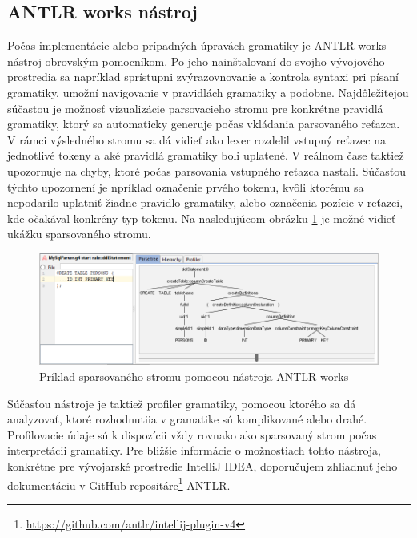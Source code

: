\subsection{ANTLR works nástroj}
Počas implementácie alebo prípadných úpravách gramatiky je ANTLR works nástroj obrovským pomocníkom. Po jeho nainštalovaní do svojho vývojového prostredia sa napríklad sprístupni zvýrazovnovanie a kontrola syntaxi pri písaní gramatiky, umožní navigovanie v pravidlách gramatiky a podobne. Najdôležitejou súčastou je možnosť vizualizácie parsovacieho stromu pre konkrétne pravidlá gramatiky, ktorý sa automaticky generuje počas vkládania parsovaného reťazca. V rámci výsledného stromu sa dá vidieť ako lexer rozdelil vstupný reťazec na jednotlivé tokeny a aké pravidlá gramatiky boli uplatené. V reálnom čase taktiež upozornuje na chyby, ktoré počas parsovania vstupného reťazca nastali. Súčasťou týchto upozornení je npríklad označenie prvého tokenu, kvôli ktorému sa nepodarilo uplatniť žiadne pravidlo gramatiky, alebo označenia pozície v reťazci, kde očakával konkrény typ tokenu. Na nasledujúcom obrázku \ref{fig:antlrWorks} je možné vidieť ukážku sparsovaného stromu.

\begin{figure}[H]
\begin{center}
\includegraphics[width=15cm]{figures/antlrWorks.PNG}
\caption{Príklad sparsovaného stromu pomocou nástroja ANTLR works}
\label{fig:antlrWorks}
\end{center}
\end{figure}

Súčasťou nástroje je taktiež profiler gramatiky, pomocou ktorého sa dá analyzovať, ktoré rozhodnutiia v gramatike sú komplikované alebo drahé. Profilovacie údaje sú k dispozícii vždy rovnako ako sparsovaný strom počas interpretácii gramatiky. Pre bližšie informácie o možnostiach tohto nástroja, konkrétne pre vývojarské prostredie IntelliJ IDEA, doporučujem zhliadnuť jeho dokumentáciu v GitHub repositáre\footnote{\url{https://github.com/antlr/intellij-plugin-v4}} ANTLR.